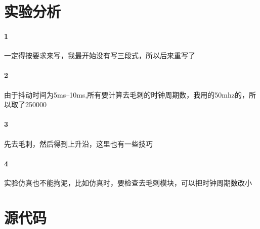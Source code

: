 \documentclass[UTF8]{ctexart}
\begin{document}
\section{实验分析}
\paragraph{1}一定得按要求来写，我最开始没有写三段式，所以后来重写了
\paragraph{2}由于抖动时间为5ms--10ms,所有要计算去毛刺的时钟周期数，我用的50mhz的，所以取了250000
\paragraph{3}先去毛刺，然后得到上升沿，这里也有一些技巧
\paragraph{4}实验仿真也不能拘泥，比如仿真时，要检查去毛刺模块，可以把时钟周期数改小

\section{源代码}
\end{document}
